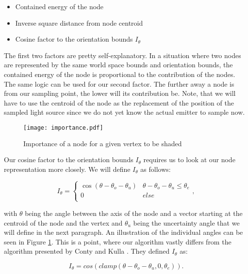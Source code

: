 \begin{itemize}
	\item Contained energy of the node
	\item Inverse square distance from node centroid
	\item Cosine factor to the orientation bounds $I_\theta$
\end{itemize}

The first two factors are pretty self-explanatory. In a situation where two nodes are represented by the same world space bounds and orientation bounds, the contained energy of the node is proportional to the contribution of the nodes. The same logic can be used for our second factor. The further away a node is from our sampling point, the lower will its contribution be. Note, that we will have to use the centroid of the node as the replacement of the position of the sampled light source since we do not yet know the actual emitter to sample now.

\begin{figure}
	\begin{center}
		\texttt{[image: importance.pdf]}
		\caption{Importance of a node for a given vertex to be shaded}
		\label{fig:importance}
	\end{center}
\end{figure}

Our cosine factor to the orientation bounds $I_\theta$ requires us to look at our node representation more closely. We will define $I_\theta$ as follows:

\begin{equation}
\label{eq:imp}
I_\theta = \begin{cases} 
\cos(\theta - \theta_o - \theta_u) & \theta - \theta_o - \theta_u \leq \theta_e \\
0 & else \\
\end{cases},
\end{equation}

with $\theta$ being the angle between the axis of the node and a vector starting at the centroid of the node and the vertex and $\theta_u$ being the uncertainty angle that we will define in the next paragraph. An illustration of the individual angles can be seen in Figure \ref{fig:importance}. This is a point, where our algorithm vastly differs from the algorithm presented by Conty and Kulla \cite{MLA,MLS}. They defined $I_\theta$ as:

\begin{equation}
I_\theta = cos(clamp(\theta - \theta_o - \theta_u, 0, \theta_e)).
\end{equation}

